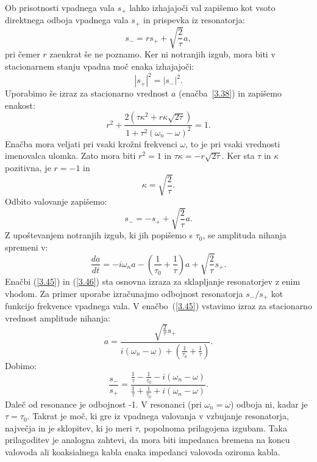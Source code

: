 Ob prisotnosti vpadnega vala $s_{+}$ lahko izhajajoči val zapišemo kot
vsoto direktnega odboja vpadnega vala $s_{+}$ in prispevka iz resonatorja:
\begin{equation}
s_{-}=rs_{+}+\sqrt{\frac{2}{\tau}}a,
\label{3.41}
\end{equation}
pri čemer $r$ zaenkrat še ne poznamo. Ker ni notranjih izgub, mora biti v 
stacionarnem stanju vpadna moč enaka izhajajoči:
\begin{equation}
|s_{+}|^{2}=|s_{-}|^{2}.
\label{3.42}
\end{equation}
Uporabimo še izraz za stacionarno vrednost $a$ (enačba~\ref{3.38}) in zapišemo
enakost:
\begin{equation}
r^{2}+\frac{2(\tau\kappa^{2}+r\kappa\sqrt{2\tau})}{1+\tau^{2}(\omega_{n}-\omega)^{2}}=1.
\label{3.43}
\end{equation}
Enačba mora veljati pri vsaki krožni  frekvenci $\omega$, to je pri vsaki vrednosti imenovalca
ulomka. Zato mora biti $r^{2}=1$ in $\tau\kappa=-r\sqrt{2\tau}$.
Ker sta $\tau$ in $\kappa$ pozitivna, je $r=-1$ in 
\begin{equation}
\kappa=\sqrt{\frac{2}{\tau}}.
\label{3.44}
\end{equation}
 Odbito valovanje zapišemo:
\begin{equation}
s_{-}=-s_{+}+\sqrt{\frac{2}{\tau}}a.
\label{3.45}
\end{equation}
Z upoštevanjem notranjih izgub, ki jih popišemo s $\tau_0$, se amplituda nihanja spremeni v:
\begin{equation}
\frac{da}{dt}=-i\omega_{n}a-\left(\frac{1}{\tau_{0}}+\frac{1}{\tau}\right)a+
\sqrt{\frac{2}{\tau}}s_{+}.
\label{3.46}
\end{equation}
 Enačbi (\ref{3.45}) in (\ref{3.46}) sta osnovna izraza za sklapljanje
resonatorjev z enim vhodom. Za primer uporabe izračunajmo odbojnost
resonatorja $s_{-}/s_{+}$ kot funkcijo frekvence vpadnega vala. V
enačbo~(\ref{3.45}) vstavimo izraz za stacionarno vrednost amplitude
nihanja:
\begin{equation}
a=\frac{\sqrt{\frac{2}{\tau}}s_{+}}{i(\omega_{n}-\omega)+(\frac{1}{\tau_{0}}+
\frac{1}{\tau})}.
\label{3.47}
\end{equation}
Dobimo:
\begin{equation}
\frac{s_{-}}{s_{+}}=\frac{\frac{1}{\tau}-\frac{1}{\tau_0}-i(\omega_{n}-\omega)}
{\frac{1}{\tau}
+\frac{1}{\tau_0}+i(\omega_{n}-\omega)}.
\label{3.48}
\end{equation}
Daleč od resonance je odbojnost -1. V resonanci (pri $\omega_{n}=\omega$)
odboja ni, kadar je $\tau=\tau_{0}$. Takrat je moč, ki gre iz
vpadnega valovanja v vzbujanje resonatorja, največja in je sklopitev,
ki jo meri $\tau$, popolnoma prilagojena izgubam. Taka prilagoditev
je analogna zahtevi, da mora biti impedanca bremena na koncu valovoda
ali koaksialnega kabla enaka impedanci valovoda oziroma kabla.

